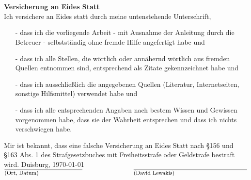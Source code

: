 
\ 

\cleardoublepage

\ 


\pagestyle{empty}

\textbf{Versicherung an Eides Statt}\\

Ich versichere an Eides statt durch meine untenstehende Unterschrift,
\begin{itemize}
\item[-] dass ich die vorliegende Arbeit - mit Ausnahme der Anleitung durch die Betreuer - selbstständig ohne fremde Hilfe angefertigt habe und
\item[-] dass ich alle Stellen, die wörtlich oder annähernd wörtlich aus fremden Quellen entnommen sind, entsprechend als Zitate gekennzeichnet habe und
\item[-] dass ich ausschließlich die angegebenen Quellen (Literatur, Internetseiten, sonstige Hilfsmittel) verwendet habe und
\item[-] dass ich alle entsprechenden Angaben nach bestem Wissen und Gewissen vorgenommen habe, dass sie der Wahrheit entsprechen und dass ich nichts verschwiegen habe.
\end{itemize}
Mir ist bekannt, dass eine falsche Versicherung an Eides Statt nach \S 156 und \S 163 Abs. 1 des Strafgesetzbuches mit Freiheitsstrafe oder Geldstrafe bestraft wird.
\vfill
Duisburg, \today\\
$\overline{\parbox{4.8cm}{(Ort, Datum)}} ~~~~~~~~~~~~~~~~~~~~~~~~~~~ \overline{\parbox{7cm}{(David Lewakis)}}$

